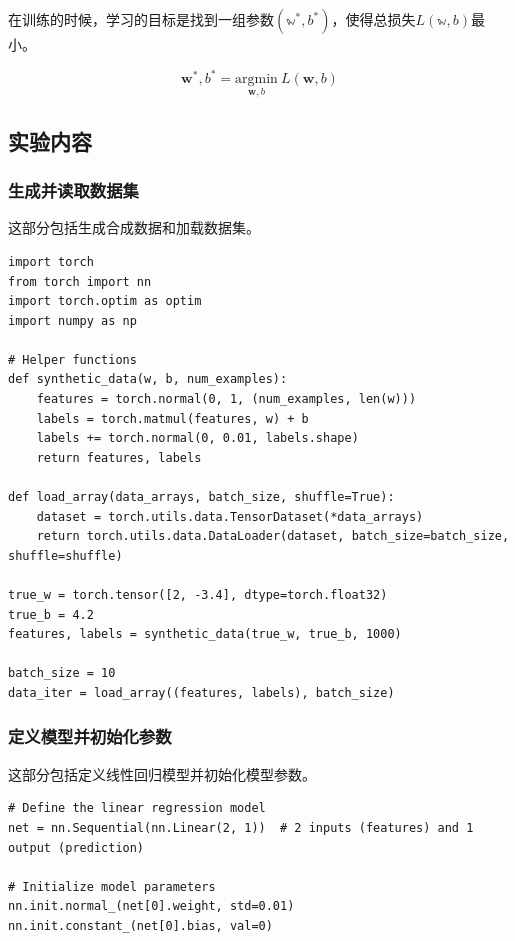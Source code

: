 \documentclass[a4paper,12pt]{article}
\begin{document}
在训练的时候，学习的目标是找到一组参数$(\mathbb{w}^*, b^*)$，使得总损失$L(\mathbb{w}, b)$最小。

\begin{equation}
\mathbf{w}^*, b^* = \underset{\mathbf{w}, b}{\mathrm{argmin}} \ L(\mathbf{w}, b)
\end{equation}

\subsection{实验内容}
\subsubsection{生成并读取数据集}
这部分包括生成合成数据和加载数据集。
\begin{lstlisting}
import torch
from torch import nn
import torch.optim as optim
import numpy as np

# Helper functions
def synthetic_data(w, b, num_examples):
    features = torch.normal(0, 1, (num_examples, len(w)))
    labels = torch.matmul(features, w) + b
    labels += torch.normal(0, 0.01, labels.shape)
    return features, labels

def load_array(data_arrays, batch_size, shuffle=True):
    dataset = torch.utils.data.TensorDataset(*data_arrays)
    return torch.utils.data.DataLoader(dataset, batch_size=batch_size, shuffle=shuffle)

true_w = torch.tensor([2, -3.4], dtype=torch.float32)
true_b = 4.2
features, labels = synthetic_data(true_w, true_b, 1000)

batch_size = 10
data_iter = load_array((features, labels), batch_size)
\end{lstlisting}

\subsubsection{定义模型并初始化参数}
这部分包括定义线性回归模型并初始化模型参数。
\begin{lstlisting}
# Define the linear regression model
net = nn.Sequential(nn.Linear(2, 1))  # 2 inputs (features) and 1 output (prediction)

# Initialize model parameters
nn.init.normal_(net[0].weight, std=0.01)
nn.init.constant_(net[0].bias, val=0)
\end{lstlisting}
\end{document}
